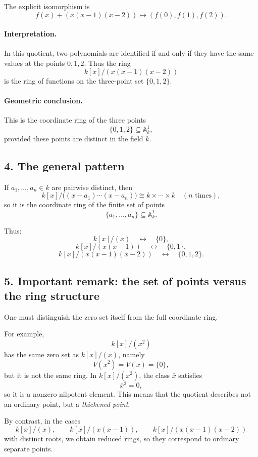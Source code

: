 \documentclass[12pt,a4paper]{article}
\theoremstyle{notespace}
\begin{document}
The explicit isomorphism is
\[
f(x)+(x(x-1)(x-2))
\longmapsto
(f(0),f(1),f(2)).
\]

\paragraph{Interpretation.}
In this quotient, two polynomials are identified if and only if they have the same values at the points \(0,1,2\). Thus the ring
\[
k[x]/(x(x-1)(x-2))
\]
is the ring of functions on the three-point set \(\{0,1,2\}\).

\paragraph{Geometric conclusion.}
This is the coordinate ring of the three points
\[
\{0,1,2\}\subseteq \mathbb A_k^1,
\]
provided these points are distinct in the field \(k\).

\subsection{4. The general pattern}

If \(a_1,\dots,a_n\in k\) are pairwise distinct, then
\[
k[x]/\bigl((x-a_1)\cdots(x-a_n)\bigr)
\cong
k\times\cdots\times k
\quad (n\text{ times}),
\]
so it is the coordinate ring of the finite set of points
\[
\{a_1,\dots,a_n\}\subseteq \mathbb A_k^1.
\]

Thus:
\[
k[x]/(x)
\quad\leftrightarrow\quad
\{0\},
\]
\[
k[x]/(x(x-1))
\quad\leftrightarrow\quad
\{0,1\},
\]
\[
k[x]/(x(x-1)(x-2))
\quad\leftrightarrow\quad
\{0,1,2\}.
\]

\subsection{5. Important remark: the set of points versus the ring structure}

One must distinguish the zero set itself from the full coordinate ring.

For example,
\[
k[x]/(x^2)
\]
has the same zero set as \(k[x]/(x)\), namely
\[
V(x^2)=V(x)=\{0\},
\]
but it is not the same ring. In \(k[x]/(x^2)\), the class \(\bar x\) satisfies
\[
\bar x^2=0,
\]
so it is a nonzero nilpotent element. This means that the quotient describes not an ordinary point, but a \emph{thickened point}.

By contrast, in the cases
\[
k[x]/(x),\qquad k[x]/(x(x-1)),\qquad k[x]/(x(x-1)(x-2))
\]
with distinct roots, we obtain reduced rings, so they correspond to ordinary separate points.
\end{document}
